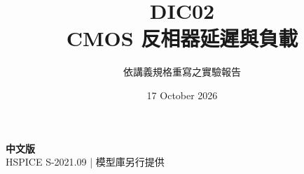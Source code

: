 \documentclass[11pt,a4paper]{article}
\title{\color{accent}DIC02\\[4pt]CMOS 反相器延遲與負載}
\author{依講義規格重寫之實驗報告}
\date{17 October 2026}
\begin{document}
\maketitle
\begin{center}\small\textbf{中文版}\\
HSPICE S-2021.09 \quad | \quad 模型庫另行提供
\end{center}


\end{document}

